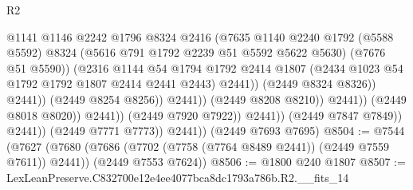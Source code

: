 \begin{lexlean}{R2}
\begin{coremodule}
                                                @1141
                                                @1146
                                                @2242
                                                @1796
                                                @8324
                                                @2416
                                                (@7635
                                                  @1140
                                                  @2240
                                                  @1792
                                                  (@5588 @5592)
                                                  @8324
                                                  (@5616 @791 @1792 @2239 @51 @5592 @5622 @5630)
                                                  (@7676 @51 @5590))
                                                (@2316
                                                  @1144
                                                  @54
                                                  @1794
                                                  @1792
                                                  @2414
                                                  @1807
                                                  (@2434
                                                    @1023
                                                    @54
                                                    @1792
                                                    @1792
                                                    @1807
                                                    @2414
                                                    @2441
                                                    @2443)
                                                  @2441))
                                              (@2449 @8324 @8326))
                                            @2441))
                                        (@2449 @8254 @8256))
                                      @2441))
                                  (@2449 @8208 @8210))
                                @2441))
                            (@2449 @8018 @8020))
                          @2441))
                      (@2449 @7920 @7922))
                    @2441))
                (@2449 @7847 @7849))
              @2441))
          (@2449 @7771 @7773))
        @2441))
    (@2449 @7693 @7695)
@8504 := @7544
    (@7627
      (@7680 (@7686 (@7702 (@7758 (@7764 @8489 @2441)) (@2449 @7559 @7611)) @2441))
      (@2449 @7553 @7624))
@8506 := @1800 @240 @1807
@8507 := LexLeanPreserve.C832700e12e4ee4077bca8dc1793a786b.R2.__fits_14

\end{coremodule}
\end{lexlean}
